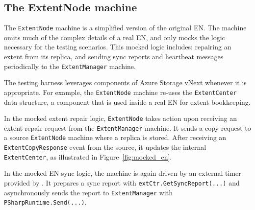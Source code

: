 \subsection{The ExtentNode machine}
\label{sec:method:mock_en}

The \texttt{ExtentNode} machine is a simplified version of the original EN. The machine omits much of the complex details of a real EN, and only mocks the logic necessary for the testing scenarios. This mocked logic includes: repairing an extent from its replica, and sending sync reports and heartbeat messages periodically to the \texttt{ExtentManager} machine.

The testing harness leverages components of Azure Storage vNext whenever it is appropriate. For example, the \texttt{ExtentNode} machine re-uses the \texttt{ExtentCenter} data structure, a component that is used inside a real EN for extent bookkeeping.

In the mocked extent repair logic, \texttt{ExtentNode} takes action upon receiving an extent repair request from the \texttt{ExtentManager} machine. It sends a copy request to a source \texttt{ExtentNode} machine where a replica is stored. After receiving an \texttt{ExtentCopyResponse} event from the source, it updates the internal \texttt{ExtentCenter}, as illustrated in Figure~\ref{fig:mocked_en}. 

In the mocked EN sync logic, the machine is again driven by an external timer provided by \psharp. It prepares a sync report with \texttt{extCtr.GetSyncReport(...)} and asynchronously sends the report to \texttt{ExtentManager} with \texttt{PSharpRuntime.Send(...)}.

